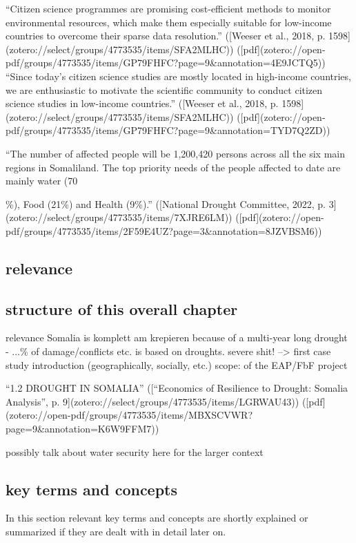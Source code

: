 “Citizen science programmes are promising cost-efficient methods to monitor environmental resources, which make them especially suitable for low-income countries to overcome their sparse data resolution.” ([Weeser et al., 2018, p. 1598](zotero://select/groups/4773535/items/SFA2MLHC)) ([pdf](zotero://open-pdf/groups/4773535/items/GP79FHFC?page=9&annotation=4E9JCTQ5))
“Since today's citizen science studies are mostly located in high-income countries, we are enthusiastic to motivate the scientific community to conduct citizen science studies in low-income countries.” ([Weeser et al., 2018, p. 1598](zotero://select/groups/4773535/items/SFA2MLHC)) ([pdf](zotero://open-pdf/groups/4773535/items/GP79FHFC?page=9&annotation=TYD7Q2ZD))

“The number of affected people will be 1,200,420 persons across all the six main regions in Somaliland. The top priority needs of the people affected to date are mainly water (70{\%), Food (21\%) and Health (9\%).” ([National Drought Committee, 2022, p. 3](zotero://select/groups/4773535/items/7XJRE6LM)) ([pdf](zotero://open-pdf/groups/4773535/items/2F59E4UZ?page=3&annotation=8JZVBSM6))

\subsection{relevance}


\subsection{structure of this overall chapter}
relevance
Somalia is komplett am krepieren because of a multi-year long drought - ...\% of damage/conflicts etc. is based on droughts. severe shit! --> first case study introduction (geographically, socially, etc.) 
scope: of the EAP/FbF project

“1.2 DROUGHT IN SOMALIA” ([“Economics of Resilience to Drought: Somalia Analysis”, p. 9](zotero://select/groups/4773535/items/LGRWAU43)) ([pdf](zotero://open-pdf/groups/4773535/items/MBXSCVWR?page=9&annotation=K6W9FFM7))

possibly talk about water security here for the larger context



\subsection{key terms and concepts} %
In this section relevant key terms and concepts are shortly explained or summarized if they are dealt with in detail later on.


}
